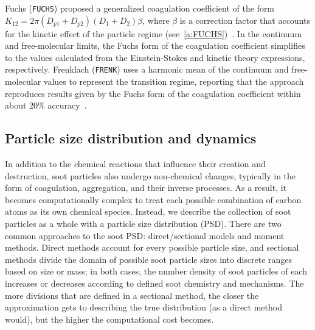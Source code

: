 \documentclass[preprint,letterpaper]{elsarticle}
\begin{document}
Fuchs (\texttt{FUCHS}) proposed a generalized coagulation coefficient of the form $K_{12}=2\pi (D_{p1}+D_{p2})(D_1+D_2)\beta$, where $\beta$ is a correction factor that accounts for the kinetic effect of the particle regime (see~\ref{a:FUCHS})~\cite{Fuchs_1964, Seinfeld_2016}. In the continuum and free-molecular limits, the Fuchs form of the coagulation coefficient simplifies to the values calculated from the Einstein-Stokes and kinetic theory expressions, respectively. Frenklach (\texttt{FRENK}) uses a harmonic mean of the continuum and free-molecular values to represent the transition regime, reporting that the approach reproduces results given by the Fuchs form of the coagulation coefficient within about 20\% accuracy~\cite{Frenklach_2002b,Kazakov_1998}.

\subsection{Particle size distribution and dynamics}
\label{ss:PSD_dynamics}

In addition to the chemical reactions that influence their creation and destruction, soot particles also undergo non-chemical changes, typically in the form of coagulation, aggregation, and their inverse processes. As a result, it becomes computationally complex to treat each possible combination of carbon atoms as its own chemical species. Instead, we describe the collection of soot particles as a whole with a particle size distribution (PSD). There are two common approaches to the soot PSD: direct/sectional models and moment methods. Direct methods account for every possible particle size, and sectional methods divide the domain of possible soot particle sizes into discrete ranges based on size or mass; in both cases, the number density of soot particles of each increases or decreases according to defined soot chemistry and mechanisms. The more divisions that are defined in a sectional method, the closer the approximation gets to describing the true distribution (as a direct method would), but the higher the computational cost becomes.
\end{document}
